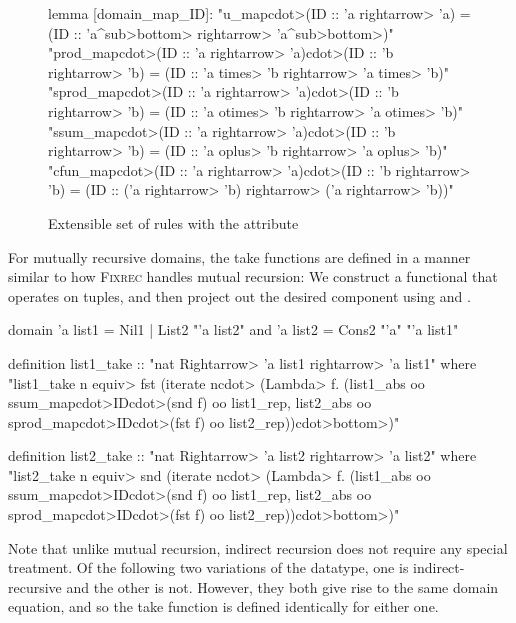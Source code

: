 \begin{figure}
\begin{isacode}
lemma [domain_map_ID]:
  "u_map\<cdot>(ID :: 'a \<rightarrow> 'a) = (ID :: 'a\<^sub>\<bottom> \<rightarrow> 'a\<^sub>\<bottom>)"
  "prod_map\<cdot>(ID :: 'a \<rightarrow> 'a)\<cdot>(ID :: 'b \<rightarrow> 'b) = (ID :: 'a \<times> 'b \<rightarrow> 'a \<times> 'b)"
  "sprod_map\<cdot>(ID :: 'a \<rightarrow> 'a)\<cdot>(ID :: 'b \<rightarrow> 'b) = (ID :: 'a \<otimes> 'b \<rightarrow> 'a \<otimes> 'b)"
  "ssum_map\<cdot>(ID :: 'a \<rightarrow> 'a)\<cdot>(ID :: 'b \<rightarrow> 'b) = (ID :: 'a \<oplus> 'b \<rightarrow> 'a \<oplus> 'b)"
  "cfun_map\<cdot>(ID :: 'a \<rightarrow> 'a)\<cdot>(ID :: 'b \<rightarrow> 'b) = (ID :: ('a \<rightarrow> 'b) \<rightarrow> ('a \<rightarrow> 'b))"
\end{isacode}
\caption{Extensible set of rules with the  attribute}
\label{fig:domain-map-ID}
\end{figure}

For mutually recursive domains, the take functions are defined in a manner similar to how \textsc{Fixrec} handles mutual recursion: We construct a functional that operates on tuples, and then project out the desired component using  and .

\begin{isacode}
domain 'a list1 = Nil1 | List2 "'a list2" and 'a list2 = Cons2 "'a" "'a list1"
\end{isacode}
\unmedskip
\begin{isacode}
definition list1_take :: "nat \<Rightarrow> 'a list1 \<rightarrow> 'a list1"
  where "list1_take n \<equiv> fst (iterate n\<cdot>
        (\<Lambda> f. (list1_abs oo ssum_map\<cdot>ID\<cdot>(snd f) oo list1_rep,
            list2_abs oo sprod_map\<cdot>ID\<cdot>(fst f) oo list2_rep))\<cdot>\<bottom>)"
\end{isacode}
\unmedskip
\begin{isacode}
definition list2_take :: "nat \<Rightarrow> 'a list2 \<rightarrow> 'a list2"
  where "list2_take n \<equiv> snd (iterate n\<cdot>
        (\<Lambda> f. (list1_abs oo ssum_map\<cdot>ID\<cdot>(snd f) oo list1_rep,
            list2_abs oo sprod_map\<cdot>ID\<cdot>(fst f) oo list2_rep))\<cdot>\<bottom>)"
\end{isacode}

Note that unlike mutual recursion, indirect recursion does not require any special treatment. Of the following two variations of the  datatype, one is indirect-recursive and the other is not. However, they both give rise to the same domain equation, and so the take function is defined identically for either one.

